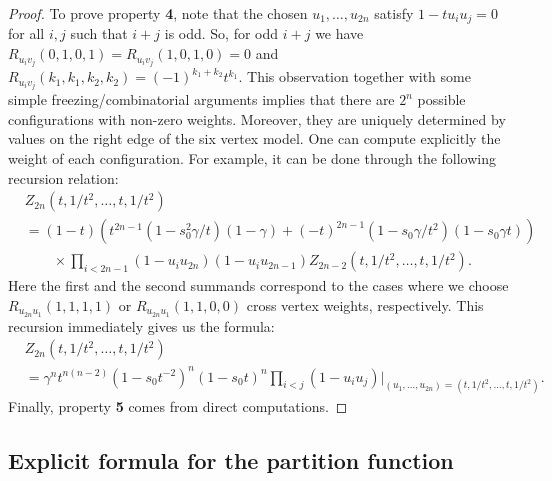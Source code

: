 \begin{proof}
	To prove property \textbf{4}, note that the chosen $u_1, \dots, u_{2n}$ satisfy 
	$
	1 - t u_i u_j = 0
	$ for all $i, j$ such that $i+j$  is odd. So, for odd $i+j$ we have $R_{u_i v_j}(0,1,0,1) = R_{u_i v_j}(1,0,1,0) = 0$ and $R_{u_i v_j}(k_1,k_1,k_2,k_2) = (-1)^{k_1 + k_2} t^{k_1}$.
	This observation together with some simple freezing/combinatorial arguments implies that there are $2^{n}$ possible configurations with non-zero weights. Moreover, they are uniquely determined by values on the right edge of the six vertex model. One can compute explicitly the weight of each configuration. For example, it can be done through the following recursion relation:
	\begin{equation*}
	\begin{split}
	&Z_{2n}(t,  1 / t^2, \dots, t,   1 / t^2)
	\\
	&=(1 - t) (t^{2n-1} (1 - s_{0}^2 \gamma/t)(1 - \gamma) + (-t)^{2n-1}(1 - s_0 \gamma/ t^{2})(1 - s_0 \gamma t))  
	\\&\qquad\times\prod_{i<2n-1} (1 - u_i u_{2n}) (1 - u_i u_{2n-1})
	Z_{2n-2} (t,  1 / t^2, \dots, t,   1 / t^2).
	\end{split}
	\end{equation*}
	Here the first and the second summands correspond to the cases where we choose $R_{u_{2n} u_{1}}(1, 1, 1, 1)$ or $R_{u_{2n} u_{1}}(1, 1, 0, 0)$ cross vertex weights, respectively. 
	This recursion immediately gives us the formula:
	\begin{equation*}
	\begin{split}
	&
	Z_{2n}(t,  1 / t^2, \dots, t,   1 / t^2) \\&
	=  \gamma^{n} t^{n(n-2)} (1 - s_{0} t^{-2})^n (1 -s_{0} t)^{n}\prod_{i<j} (1 - u_i u_j)|_{(u_1, ... , u_{2n}) = (t,  1 / t^2, \dots, t,   1 / t^2)}.
	\end{split}
	\end{equation*}
	Finally, property {\bf 5} comes from direct computations.
\end{proof}

\subsection{Explicit formula for the partition function}

